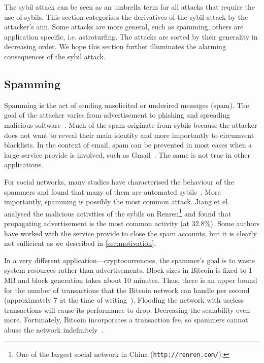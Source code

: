 The sybil attack can be seen as an umbrella term for all attacks that require
the use of sybils. This section categorises the derivatives of the sybil attack
by the attacker's aim. Some attacks are more general, such as spamming, others
are application specific, i.e. astroturfing. The attacks are sorted by their
generality in decreasing order. We hope this section further illuminates the
alarming consequences of the sybil attack.

\subsection{Spamming}
Spamming is the act of sending unsolicited or undesired messages (spam). The
goal of the attacker varies from advertisement to phishing and spreading
malicious software~\cite{twittermalware1, twittermalware2}. Much of the spam
originate from sybils because the attacker does not want to reveal their main
identity and more importantly to circumvent blacklists. In the context of email,
spam can be prevented in most cases when a large service provide is involved,
such as Gmail~\cite{adwords}. The same is not true in other applications.

For social networks, many studies have characterised the behaviour of the
spammers and found that many of them are automated
sybils~\cite{stringhini2010detecting, yang2012analyzing, grier2010spam,
  jiang2015understanding}. More importantly, spamming is possibly the most
common attack. Jiang et el.~\cite{jiang2015understanding} analysed the malicious
activities of the sybils on Renren\footnote{One of the largest social network in
  China (\texttt{http://renren.com/}).} and found that propagating advertisement
is the most common activity (at 32.8\%). Some authors have worked with the
service provide to close the spam accounts, but it is clearly not sufficient as
we described in \autoref{sec:motivation}.

In a very different application---cryptocurrencies, the spammer's goal is to
waste system resources rather than advertisements. Block sizes in Bitcoin is
fixed to 1 MB and block generation takes about 10 minutes. Thus, there is an
upper bound for the number of transactions that the Bitcoin network can handle
per second (approximately 7 at the time of writing~\cite{bitcointps}). Flooding
the network with useless transactions will cause its performance to drop.
Decreasing the scalability even more. Fortunately, Bitcoin incorporates a
transaction fee, so spammers cannot abuse the network
indefinitely~\cite{bitcoinspam}.


